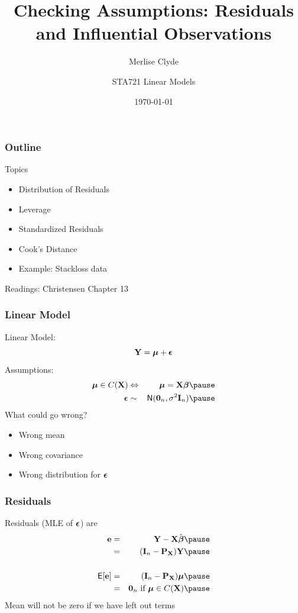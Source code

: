 \documentclass[]{beamer}
\title{Checking Assumptions: Residuals  and Influential Observations}
\subtitle{Merlise Clyde}
\author{STA721 Linear Models}
\institute{Duke University}
\date{\today}
\begin{document}
\maketitle

\begin{frame}\frametitle{Outline}
Topics
  \begin{itemize}
  \item Distribution of Residuals
  \item Leverage
  \item Standardized Residuals
  \item Cook's Distance
  \item Example: Stackloss data

  \end{itemize}


Readings: Christensen  Chapter 13
\end{frame}
\begin{frame} \frametitle{ Linear Model}
Linear Model:
 $$ \mathbf{Y} = \boldsymbol{\mu} + \boldsymbol{\epsilon} $$ \pause
Assumptions: \pause
\begin{eqnarray*}
   \mub \in C(\X) & \Leftrightarrow & \mub = \X \b \pause \\
  \eps  & \sim &  \N(\zero_n, \sigma^2 \I_n) \pause
\end{eqnarray*}
What could go wrong?
\begin{itemize}
  \item  Wrong mean \pause \\
\item Wrong covariance  \pause \\
\item Wrong distribution for $\boldsymbol{\epsilon}$  \\
\end{itemize}
\end{frame}
\begin{frame}
  \frametitle{Residuals}
  Residuals  (MLE of $\boldsymbol{\epsilon}$) are
  \begin{eqnarray*}
\e & =  & \Y - \X \bhat    \pause \\
  & = & (\I_n - \P_\X) \Y  \pause \\
 &   & \\
\E[\e] & = &  (\I_n - \P_\X)\mub  \pause \\
       & = & \zero_n \text{ if } \mub \in C(\X)  \pause
  \end{eqnarray*}
Mean will not be zero if we have left out terms
\end{frame}
\end{document}
